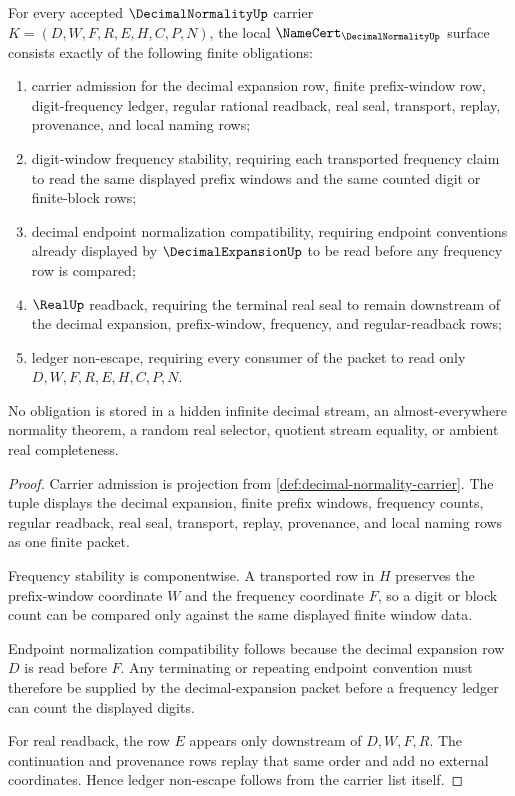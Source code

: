 \begin{theorem}\label{thm:decimal-normality-namecert-obligations}
For every accepted $\DecimalNormalityUp$ carrier
$K=(D,W,F,R,E,H,C,P,N)$, the local $\NameCert_{\DecimalNormalityUp}$ surface
consists exactly of the following finite obligations:
\begin{enumerate}
\item carrier admission for the decimal expansion row, finite prefix-window
row, digit-frequency ledger, regular rational readback, real seal, transport,
replay, provenance, and local naming rows;
\item digit-window frequency stability, requiring each transported frequency
claim to read the same displayed prefix windows and the same counted digit or
finite-block rows;
\item decimal endpoint normalization compatibility, requiring endpoint
conventions already displayed by $\DecimalExpansionUp$ to be read before any
frequency row is compared;
\item $\RealUp$ readback, requiring the terminal real seal to remain downstream
of the decimal expansion, prefix-window, frequency, and regular-readback rows;
\item ledger non-escape, requiring every consumer of the packet to read only
$D,W,F,R,E,H,C,P,N$.
\end{enumerate}
No obligation is stored in a hidden infinite decimal stream, an
almost-everywhere normality theorem, a random real selector, quotient stream
equality, or ambient real completeness.
\end{theorem}
\begin{proof}
Carrier admission is projection from
\autoref{def:decimal-normality-carrier}. The tuple displays the decimal
expansion, finite prefix windows, frequency counts, regular readback, real
seal, transport, replay, provenance, and local naming rows as one finite
packet.

Frequency stability is componentwise. A transported row in $H$ preserves the
prefix-window coordinate $W$ and the frequency coordinate $F$, so a digit or
block count can be compared only against the same displayed finite window data.

Endpoint normalization compatibility follows because the decimal expansion row
$D$ is read before $F$. Any terminating or repeating endpoint convention must
therefore be supplied by the decimal-expansion packet before a frequency
ledger can count the displayed digits.

For real readback, the row $E$ appears only downstream of $D,W,F,R$. The
continuation and provenance rows replay that same order and add no external
coordinates. Hence ledger non-escape follows from the carrier list itself.
\end{proof}

